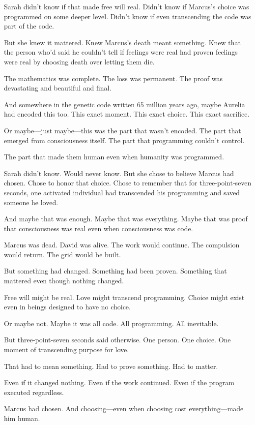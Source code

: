 Sarah didn't know if that made free will real. Didn't know if Marcus's choice was programmed on some deeper level. Didn't know if even transcending the code was part of the code.

But she knew it mattered. Knew Marcus's death meant something. Knew that the person who'd said he couldn't tell if feelings were real had proven feelings were real by choosing death over letting them die.

The mathematics was complete. The loss was permanent. The proof was devastating and beautiful and final.

And somewhere in the genetic code written 65 million years ago, maybe Aurelia had encoded this too. This exact moment. This exact choice. This exact sacrifice.

Or maybe—just maybe—this was the part that wasn't encoded. The part that emerged from consciousness itself. The part that programming couldn't control.

The part that made them human even when humanity was programmed.

Sarah didn't know. Would never know. But she chose to believe Marcus had chosen. Chose to honor that choice. Chose to remember that for three-point-seven seconds, one activated individual had transcended his programming and saved someone he loved.

And maybe that was enough. Maybe that was everything. Maybe that was proof that consciousness was real even when consciousness was code.

Marcus was dead. David was alive. The work would continue. The compulsion would return. The grid would be built.

But something had changed. Something had been proven. Something that mattered even though nothing changed.

Free will might be real. Love might transcend programming. Choice might exist even in beings designed to have no choice.

Or maybe not. Maybe it was all code. All programming. All inevitable.

But three-point-seven seconds said otherwise. One person. One choice. One moment of transcending purpose for love.

That had to mean something. Had to prove something. Had to matter.

Even if it changed nothing. Even if the work continued. Even if the program executed regardless.

Marcus had chosen. And choosing—even when choosing cost everything—made him human.

